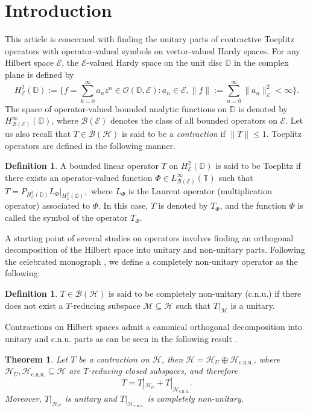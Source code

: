 \documentclass[12pt]{amsart}
\numberwithin{equation}{section}
\newtheorem{thm}[propn]{Theorem}
\theoremstyle{definition}
\newtheorem{defn}[propn]{Definition}
\newcommand{\D}{\mathbb{D}}
\newcommand{\T}{\mathbb{T}}
\newcommand{\1}{{\mbox{\bf 1}}}
\newcommand{\clb}{\mathcal{B}}
\newcommand{\cle}{\mathcal{E}}
\newcommand{\clh}{\mathcal{H}}
\newcommand{\clm}{\mathcal{M}}
\begin{document}
\section{Introduction}
This article is concerned with finding the unitary parts of contractive Toeplitz operators with operator-valued symbols on vector-valued Hardy spaces.  For any Hilbert space $\cle$, the $\cle$-valued Hardy space on the unit disc $\D$ in the complex plane is defined by
\[
H_{\cle}^2(\D) := \{f = \sum_{k=0}^{\infty} a_n z^n \in \mathcal{O}(\D,\cle): a_n \in \cle, \|f\|:= \sum_{n=0}^{\infty} \|a_n\|_{\cle}^2 < \infty\}.
\]
The space of operator-valued bounded analytic functions on $\D$ is denoted by $H_{\clb(\cle)}^{\infty}(\D)$, where $\clb(\cle)$ denotes the class of all bounded operators on $\cle$. Let us also recall that $T \in \clb(\clh)$ is said to be a \textit{contraction} if $\|T\| \leq 1$.
Toeplitz operators are defined in the following manner.
\begin{defn}
A bounded linear operator $T$ on $H_{\cle}^2(\D)$ is said to be Toeplitz if there exists an operator-valued function $\Phi \in L_{\clb(\cle)}^{\infty}(\mathbb{T})$ such that $T = P_{H_{\cle}^2(\D)} L_{\Phi}|_{H_{\cle}^2(\D)},$ where $L_{\Phi}$ is the Laurent operator (multiplication operator) associated to $\Phi.$ In this case, $T$ is denoted by $T_{\Phi}$, and the function $\Phi$ is called the symbol of the operator $T_{\Phi}.$
\end{defn}
A starting point of several studies on operators involves finding an orthogonal decomposition of the Hilbert space into unitary and non-unitary parts. Following the celebrated monograph \cite{NF}, we define a completely non-unitary operator as the following:
\begin{defn}
$T \in \clb(\clh)$ is said to be completely non-unitary (c.n.u.) if there does not exist a $T$-reducing subspace $\clm \subseteq \clh$ such that $T|_{\clm}$ is a unitary.
\end{defn}
Contractions on Hilbert spaces admit a canonical orthogonal decomposition into unitary and c.n.u. parts as can be seen in the following result \cite{NF}.

\begin{thm}\label{contdeco}
Let $T$ be a contraction on $\clh$, then $ \clh = \clh_U \oplus \clh_{\text{c.n.u.}}$, where $\clh_U,\clh_{\text{c.n.u.}} \subseteq \clh$ are $T$-reducing closed subspaces, and therefore
\[
T = T|_{\clh_U} + T|_{\clh_{\text{c.n.u.}}}.
\]
Moreover, $T|_{\clh_U}$ is unitary and $T|_{\clh_{\text{c.n.u.}}}$ is  completely non-unitary.
\end{thm}
\end{document}
